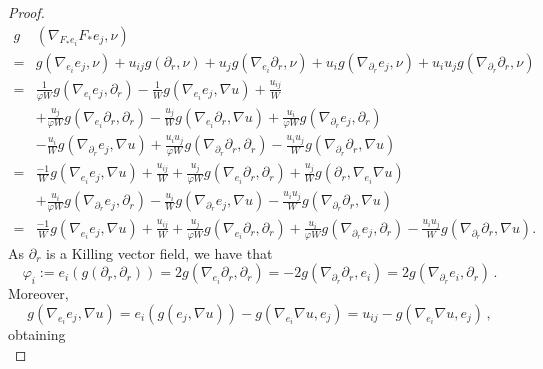 \documentclass[oneside,12pt]{amsart}
\theoremstyle{definition}
\begin{document}
\begin{proof}
\begin{align*}
   g& \left( \nabla_{F_* e_i} F_* e_j , \nu \right)  \\ =& g\left(\nabla_{e_i}e_j,\nu\right)
    +u_{ij}g\left(\partial_r,\nu\right)
    +u_j g\left(\nabla_{e_i} \partial_r,\nu\right)
    +u_i g\left(\nabla_{\partial_r} e_j,\nu\right)
    +u_i u_j g\left(\nabla_{\partial_r} \partial_r,\nu\right) \\
  =  & \frac{1}{\varphi W} g\left(\nabla_{e_i}e_j,\partial_r\right)
    -\frac{1}{W}g\left(\nabla_{e_i}e_j,\nabla u\right)  +\frac{u_{ij}}{W} \\
     & +\frac{u_j}{\varphi W}g\left(\nabla_{e_i}\partial_r,\partial_r\right)
    -\frac{u_j}{W}g\left(\nabla_{e_i}\partial_r,\nabla u\right)
     +\frac{u_i}{\varphi W}g\left(\nabla_{\partial_r}e_j,\partial_r\right) \\
    &-\frac{u_i}{W}g\left(\nabla_{\partial_r}e_j,\nabla u\right)
    + \frac{u_iu_j}{\varphi W}g(\nabla_{\partial_r}\partial_r,\partial_r) - \frac{u_iu_j}{W} g(\nabla_{\partial_r}\partial_r,\nabla u)\\
    = &\frac{-1}{W}g\left(\nabla_{e_i}e_j,\nabla u\right)+\frac{u_{ij}}{W}
    +\frac{u_j}{\varphi W}g\left(\nabla_{e_i}\partial_r,\partial_r\right)
    +\frac{u_j}{W}g\left(\partial_r,\nabla_{e_i}\nabla u\right)\\
    &+\frac{u_i}{\varphi W} g\left(\nabla_{\partial_r}e_j,\partial_r\right)-\frac{u_i}{W}g\left(\nabla_{\partial_r}e_j,\nabla u\right)-\frac{u_iu_j}{W}g\left(\nabla_{\partial_r} \partial_r,\nabla u\right)\\
    =& \frac{-1}{W}g\left(\nabla_{e_i}e_j,\nabla u\right)
    +\frac{u_{ij}}{W}+\frac{u_j}{\varphi W}g\left(\nabla_{e_i}\partial_r,\partial_r\right)
    +\frac{u_i}{\varphi W}g\left(\nabla_{\partial_r}e_j,\partial_r\right)
    -\frac{u_iu_j}{W}g\left(\nabla_{\partial_r} \partial_r,\nabla u\right).
    \end{align*}
As $\partial_r$ is a Killing vector field, we have that
\begin{equation}\label{eq:ci}
\varphi_i:=e_i(g(\partial_r,\partial_r))=2g\left(\nabla_{e_i}\partial_r,\partial_r\right)=-2g\left(\nabla_{\partial_r} \partial_r,e_i\right)=2g\left(\nabla_{\partial_r}e_i,\partial_r\right) \, .
\end{equation}
Moreover,
\[g\left(\nabla_{e_i}e_j,\nabla u\right)
=e_i(g(e_j,\nabla u))-g\left(\nabla_{e_i}\nabla u,e_j\right)=u_{ij}-g(\nabla_{e_i}\nabla u,e_j) \, , \]
obtaining
\begin{equation}

\end{equation}
\end{proof}
\end{document}
